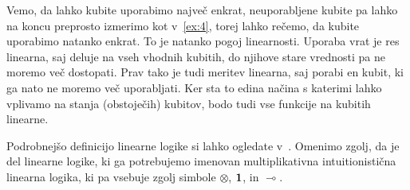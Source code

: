 Vemo, da lahko kubite uporabimo največ enkrat, neuporabljene kubite pa lahko na koncu preprosto izmerimo kot v~\ref{ex:4}, torej lahko rečemo, da kubite uporabimo natanko enkrat.
To je natanko pogoj linearnosti.
Uporaba vrat je res linearna, saj deluje na vseh vhodnih kubitih, do njihove stare vrednosti pa ne moremo več dostopati.
Prav tako je tudi meritev linearna, saj porabi en kubit, ki ga nato ne moremo več uporabljati.
Ker sta to edina načina s katerimi lahko vplivamo na stanja (obstoječih) kubitov, bodo tudi vse funkcije na kubitih linearne.

Podrobnejšo definicijo linearne logike si lahko ogledate v~\cite{girard-linear-logic-1987,girard-linear-logic-1995, nlab:linear_logic}.
Omenimo zgolj, da je del linearne logike, ki ga potrebujemo imenovan multiplikativna intuitionistična linearna logika, ki pa vsebuje zgolj simbole \(⊗\), \(\mathbf{1}\), in \(⊸\).




